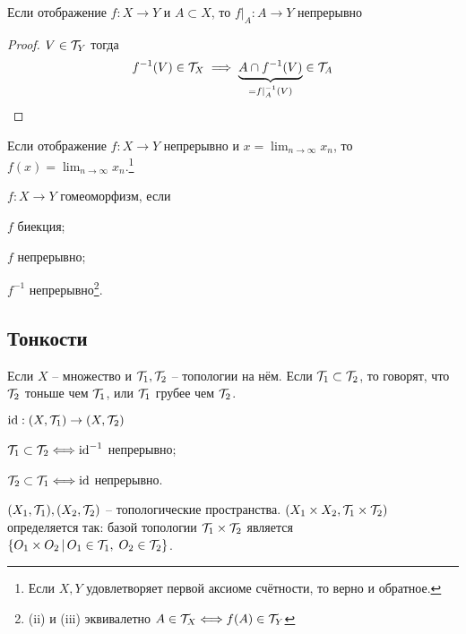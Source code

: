 \begin{proposition}
    Если отображение $f\colon X \to Y$ и $A\subset X$, то $f|_A: A\to Y$ непрерывно
\end{proposition}
\begin{proof}
    $V\in \mathcal T_Y$ тогда $$f^{-1}(V) \in \mathcal T_X \implies \underbrace{A\cap f^{-1}(V)}_{=f|_{A}^{-1}(V)} \in \mathcal T_A$$
\end{proof}

\begin{proposition}
    Если отображение $f\colon X \to Y$ непрерывно и $x = \lim_{n\to\infty} x_n$, то $f(x) = \lim_{n\to\infty}x_n$.\footnote{Если $X, Y$ удовлетворяет первой аксиоме счётности, то верно и обратное.}
\end{proposition}



\begin{definition}[Гомеоморфизм]
    $f\colon X\to Y$ гомеоморфизм, если 
    \begin{conditions}
        \item $f$ биекция;
        \item $f$ непрерывно;
        \item $f^{-1}$ непрерывно\footnote{(ii) и (iii) эквивалетно $A \in \mathcal T_X \Longleftrightarrow f(A) \in \mathcal T_Y$}.
    \end{conditions}
\end{definition}

\subsection{Тонкости}

\begin{definition}
    Если $X$ -- множество и $\mathcal T_1, \mathcal T_2$ -- топологии на нём. Если $\mathcal T_1 \subset \mathcal T_2$, то говорят, что $\mathcal T_2$ тоньше чем $\mathcal T_1$, или $\mathcal T_1$ грубее чем $\mathcal T_2$.
\end{definition}
\begin{proposition}
    $\operatorname{id}:(X, \mathcal T_1) \to (X, \mathcal T_2)$ \begin{conditions}
        \item $\mathcal T_1 \subset \mathcal T_2 \Longleftrightarrow \operatorname{id}^{-1}$ непрерывно;
        \item $\mathcal T_2 \subset \mathcal T_1 \Longleftrightarrow \operatorname{id}$ непрерывно. 
    \end{conditions}
\end{proposition}

\begin{definition}
    $(X_1, \mathcal T_1), (X_2, \mathcal T_2)$ -- топологические пространства. $(X_1\times X_2, \mathcal T_1 \times \mathcal T_2)$ определяется так: базой топологии $\mathcal T_1\times\mathcal T_2$ является $\{O_1\times O_2 \,|\, O_1 \in \mathcal T_1, \; O_2 \in \mathcal T_2\}$.
\end{definition}


